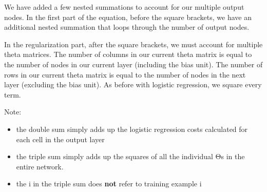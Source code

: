 \documentclass[
]{article}
\providecommand{\tightlist}{%
  \setlength{\itemsep}{0pt}\setlength{\parskip}{0pt}}
\begin{document}
We have added a few nested summations to account for our multiple output
nodes. In the first part of the equation, before the square brackets, we
have an additional nested summation that loops through the number of
output nodes.

In the regularization part, after the square brackets, we must account
for multiple theta matrices. The number of columns in our current theta
matrix is equal to the number of nodes in our current layer (including
the bias unit). The number of rows in our current theta matrix is equal
to the number of nodes in the next layer (excluding the bias unit). As
before with logistic regression, we square every term.

Note:

\begin{itemize}
\tightlist
\item
  the double sum simply adds up the logistic regression costs calculated
  for each cell in the output layer
\item
  the triple sum simply adds up the squares of all the individual Θs in
  the entire network.
\item
  the i in the triple sum does \textbf{not} refer to training example i
\end{itemize}
\end{document}
